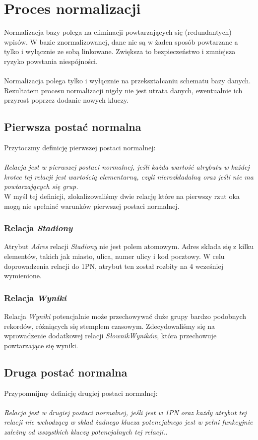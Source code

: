 \documentclass{mwrep}
\begin{document}
\section{Proces normalizacji}
Normalizacja bazy polega na eliminacji powtarzających się (redundantych) wpisów. W bazie 
znormalizowanej, dane nie są w żaden sposób powtarzane a tylko i wyłącznie ze sobą linkowane. 
Zwiększa to bezpieczeństwo i zmniejsza ryzyko powstania niespójności. \\
\\
\indent Normalizacja polega tylko i wyłącznie na przekształcaniu schematu bazy danych. Rezultatem
procesu normalizacji nigdy nie jest utrata danych, ewentualnie ich przyrost poprzez dodanie nowych
kluczy\cite{Kowalczyk1}.

\subsection{Pierwsza postać normalna}
Przytoczmy definicję pierwszej postaci normalnej: \\
\\
\emph{Relacja jest w pierwszej postaci normalnej, jeśli każda wartość atrybutu
w każdej krotce tej relacji jest wartością elementarną, czyli
nierozkładalną oraz jeśli nie ma powtarzających się grup\cite{Kowalczyk1}.}\\

W myśl tej definicji, zlokalizowaliśmy dwie relację które na pierwszy rzut oka mogą nie spełniać 
warunków pierwszej postaci normalnej. 

\subsubsection{Relacja \emph{Stadiony}}
Atrybut \emph{Adres} relacji \emph{Stadiony} nie jest polem atomowym. Adres składa się z kilku elementów, takich jak
miasto, ulica, numer ulicy i kod pocztowy. W celu doprowadzenia relacji do 1PN, atrybut ten został rozbity na 4 wcześniej
wymienione.

\subsubsection{Relacja \emph{Wyniki}}
Relacja \emph{Wyniki} potencjalnie może przechowywać duże grupy bardzo podobnych rekordów, różniących się 
stemplem czasowym. Zdecydowaliśmy się na wprowadzenie dodatkowej relacji \emph{SłownikWyników}, która przechowuje powtarzające się
wyniki.

\subsection{Druga postać normalna}
Przypomnijmy definicję drugiej postaci normalnej: \\
\\
\emph{Relacja jest w drugiej postaci normalnej, jeśli jest w 1PN oraz każdy
atrybut tej relacji nie wchodzący w skład żadnego klucza potencjalnego
jest w pełni funkcyjnie zależny od wszystkich kluczy potencjalnych
tej relacji.\cite{Kowalczyk1}.}\\
\end{document}
